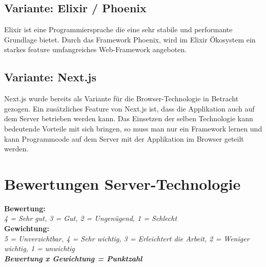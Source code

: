 \subsection{Variante: Elixir / Phoenix}

Elixir ist eine Programmiersprache die eine sehr stabile und performante Grundlage
bietet. Durch das Framework Phoenix, wird im Elixir Ökosystem ein starkes feature
umfangreiches Web-Framework angeboten.

\subsection{Variante: Next.js}

Next.js wurde bereits als Variante für die Browser-Technologie in Betracht
gezogen. Ein zusätzliches Feature von Next.js ist, dass die Applikation auch
auf dem Server betrieben werden kann.
Das Einsetzen der selben Technologie kann bedeutende Vorteile mit sich bringen,
so muss man nur ein Framework lernen und kann Programmcode auf dem Server mit
der Applikation im Browser geteilt werden.

\clearpage
\section{Bewertungen Server-Technologie}\label{bewertungen-server-technologie}

\textbf{Bewertung:}\\
\textit{4 = Sehr gut, 3 = Gut, 2 = Ungenügend, 1 = Schlecht}\\
\textbf{Gewichtung:}\\
\textit{5 = Unverzichtbar, 4 = Sehr wichtig, 3 = Erleichtert die Arbeit, 2 = Weniger wichtig, 1 = unwichtig}\\

\textbf{\textit{Bewertung x Gewichtung = Punktzahl}}

